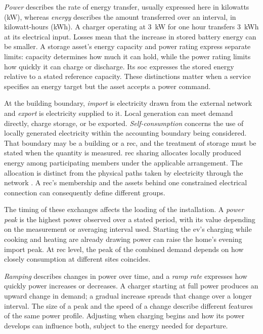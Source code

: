 \emph{Power} describes the rate of energy transfer, usually expressed here in kilowatts (kW), whereas \emph{energy} describes the amount transferred over an interval, in kilowatt-hours (kWh). A charger operating at 3~kW for one hour transfers 3~kWh at its electrical input. Losses mean that the increase in stored battery energy can be smaller. A storage asset's energy capacity and power rating express separate limits: capacity determines how much it can hold, while the power rating limits how quickly it can charge or discharge. Its \gls{soc} expresses the stored energy relative to a stated reference capacity. These distinctions matter when a service specifies an energy target but the asset accepts a power command.

At the building boundary, \emph{import} is electricity drawn from the external network and \emph{export} is electricity supplied to it. Local generation can meet demand directly, charge storage, or be exported. \emph{Self-consumption} concerns the use of locally generated electricity within the accounting boundary being considered. That boundary may be a building or a \gls{rec}, and the treatment of storage must be stated when the quantity is measured. \gls{rec} sharing allocates locally produced energy among participating members under the applicable arrangement. The allocation is distinct from the physical paths taken by electricity through the network \parencite{moret2019energycollectives,reis2021businessmodels}. A \gls{rec}'s membership and the assets behind one constrained electrical connection can consequently define different groups.

The timing of these exchanges affects the loading of the installation. A \emph{power peak} is the highest power observed over a stated period, with its value depending on the measurement or averaging interval used. Starting the \gls{ev}'s charging while cooking and heating are already drawing power can raise the home's evening import peak. At \gls{rec} level, the peak of the combined demand depends on how closely consumption at different sites coincides.

\emph{Ramping} describes changes in power over time, and a \emph{ramp rate} expresses how quickly power increases or decreases. A charger starting at full power produces an upward change in demand; a gradual increase spreads that change over a longer interval. The size of a peak and the speed of a change describe different features of the same power profile. Adjusting when charging begins and how its power develops can influence both, subject to the energy needed for departure.

